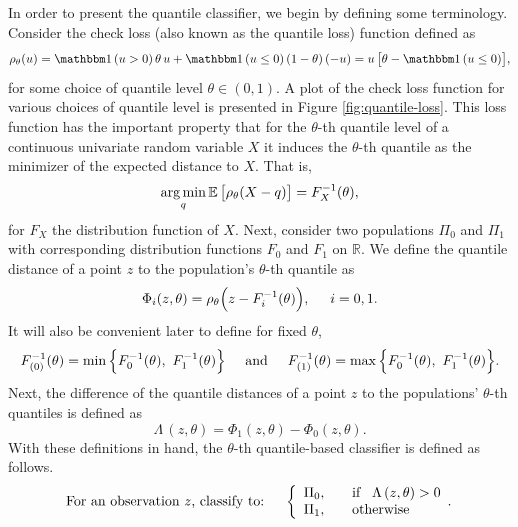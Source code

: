 In order to present the quantile classifier, we begin by defining some
terminology.  Consider the check loss (also known as the quantile loss) function
defined as
\begin{align}
  \label{eq:check-loss}
  \rho_\theta(u)
  = \ind(u > 0)\, \theta\, u  + \ind (u \leq 0)\, (1 - \theta)\, (-u)
  = u\, \big[ \theta - \ind(u \leq 0) \big],
\end{align}
for some choice of quantile level $\theta \in (0,1)$.  A plot of the check loss
function for various choices of quantile level is presented in Figure
\ref{fig:quantile-loss}.  This loss function has the important property that for
the $\theta$-th quantile level of a continuous univariate random variable $X$ it
induces the $\theta$-th quantile as the minimizer of the expected distance to
$X$.  That is,
\begin{equation}
  \label{eq:check-loss-min}
  \operatorname*{arg\,min}_q \mathbb{E}\, \big[ \rho_\theta (X - q) \big] = F_X^{-1}(\theta),
\end{equation}
for $F_X$ the distribution function of $X$.  Next, consider two populations
$\Pi_0$ and $\Pi_1$ with corresponding distribution functions $F_0$ and $F_1$ on
$\mathbb{R}$.  We define the quantile distance of a point $z$ to the
population's $\theta$-th quantile as
\begin{equation}
  \label{eq:phi}
  \Phi_i(z, \theta) = \rho_{\theta}\Big(z - F_i^{-1}(\theta)\Big),
  \hspace{5mm} i = 0, 1.
\end{equation}
It will also be convenient later to define for fixed $\theta$,
\begin{equation}
  \label{eq:F-order-stats}
  F_{(0)}^{-1}(\theta) = \min\Big\{ F_0^{-1}(\theta),~ F_1^{-1}(\theta) \Big\}
  \hspace{5mm} \text{and} \hspace{5mm}
  F_{(1)}^{-1}(\theta) = \max\Big\{ F_0^{-1}(\theta),~ F_1^{-1}(\theta) \Big\}.
\end{equation}
Next, the difference of the quantile distances of a point $z$ to the populations'
$\theta$-th quantiles is defined as
\begin{equation}
  \Lambda\,(z, \theta) = \Phi_1(z, \theta) - \Phi_0(z, \theta).
\end{equation}
With these definitions in hand, the $\theta$-th quantile-based classifier is
defined as follows.
\begin{equation}
  \label{eq:quantile-classifier}
  \text{For an observation $z$, classify to:} \hspace{5mm} \left\{ 
    \begin{array}{lcl}
      \Pi_0, & & \text{if} \hspace{3mm}\Lambda\,(z, \theta) > 0 \\[0ex]
      \Pi_1, & & \text{otherwise}
    \end{array} .
  \right.
\end{equation}
